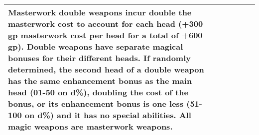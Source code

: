 \begin{longtable}{llllll}
\hline
\multicolumn{1}{|p{0.577in}|}{\begin{minipage}[t]{0.577in}\raggedleft
2 Masterwork double weapons incur double the masterwork cost to account for each 
head (+300 gp masterwork cost per head for a total of +600 gp). Double weapons 
have separate magical bonuses for their different heads. If randomly determined, 
the second head of a double weapon has the same enhancement bonus as the main head 
(01-50 on d\%), doubling the cost of the bonus, or its enhancement bonus is one 
less (51-100 on d\%) and it has no special abilities. All magic weapons are masterwork 
weapons.\end{minipage}}\\
\hline
\end{longtable}

\vspace{12pt}
